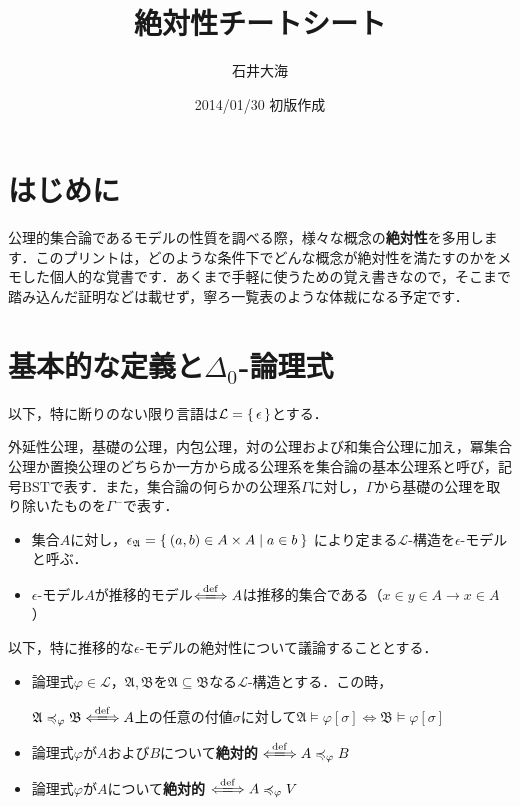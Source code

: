 \documentclass[xelatex,a4j,jadriver=standard]{bxjsarticle}
\title{絶対性チートシート}
\author{石井大海}
\date{2014/01/30 初版作成}
\newcommand{\BST}{\mathrm{BST}}
\begin{document}
\maketitle

\section{はじめに}
公理的集合論であるモデルの性質を調べる際，様々な概念の{\bfseries 絶対性}を多用します．このプリントは，どのような条件下でどんな概念が絶対性を満たすのかをメモした個人的な覚書です．あくまで手軽に使うための覚え書きなので，そこまで踏み込んだ証明などは載せず，寧ろ一覧表のような体裁になる予定です．

\section{基本的な定義と$\Delta_0$-論理式}
以下，特に断りのない限り言語は$\mathcal{L} = \set{\epsilon}$とする．

\begin{definition}
 外延性公理，基礎の公理，内包公理，対の公理および和集合公理に加え，冪集合公理か置換公理のどちらか一方から成る公理系を集合論の基本公理系と呼び，記号$\BST$で表す．また，集合論の何らかの公理系$\Gamma$に対し，$\Gamma$から基礎の公理を取り除いたものを$\Gamma^-$で表す．
\end{definition}

\begin{definition}
\begin{itemize}
 \item 集合$A$に対し，$\epsilon_\mathfrak{A} = \Set{ (a, b) \in A \times A | a \in b}$ により定まる$\mathcal{L}$-構造を$\epsilon$-モデルと呼ぶ．
 \item $\epsilon$-モデル$A$が推移的モデル$\defs A$は推移的集合である（$x \in y \in A \rightarrow x \in A$）
\end{itemize}
\end{definition}

以下，特に推移的な$\epsilon$-モデルの絶対性について議論することとする．

\begin{definition}[絶対性]
 \begin{itemize}
  \item 論理式$\varphi \in \mathcal{L}$，$\mathfrak{A}, \mathfrak{B}$を$\mathfrak{A} \subseteq \mathfrak{B}$なる$\mathcal{L}$-構造とする．この時，
	
	$\mathfrak{A} \preccurlyeq_\varphi \mathfrak{B} \defs A$上の任意の付値$\sigma$に対して$\mathfrak{A} \models \varphi[\sigma] \Leftrightarrow \mathfrak{B} \models \varphi[\sigma]$
  \item 論理式$\varphi$が$A$および$B$について{\bfseries 絶対的} $\defs A \preccurlyeq_\varphi B$
  \item 論理式$\varphi$が$A$について{\bfseries 絶対的} $\defs A \preccurlyeq_\varphi V$
 \end{itemize}
\end{definition}
\end{document}
